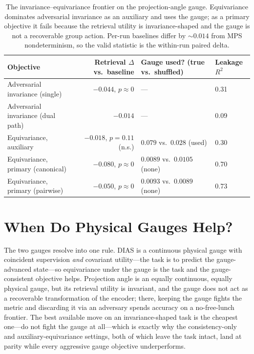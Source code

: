 \documentclass[11pt]{article}
\begin{document}
\begin{table}[h]
\centering
\caption{The invariance--equivariance frontier on the projection-angle gauge. Equivariance dominates
adversarial invariance as an auxiliary and uses the gauge; as a primary objective it fails because
the retrieval utility is invariance-shaped and the gauge is not a recoverable group action.
Per-run baselines differ by $\sim\!0.014$ from MPS nondeterminism, so the valid statistic is the
within-run paired delta.}
\label{tab:frontier}
\small
\begin{tabular}{lrll}
\toprule
Objective & Retrieval $\Delta$ vs.\ baseline & Gauge used? (true vs.\ shuffled) & Leakage $R^2$ \\
\midrule
Adversarial invariance (single) & $-0.044$, $p\approx0$ & --- & 0.31 \\
Adversarial invariance (dual path) & $-0.014$ & --- & 0.09 \\
Equivariance, auxiliary & $-0.018$, $p=0.11$ (n.s.) & $0.079$ vs.\ $0.028$ (used) & 0.30 \\
Equivariance, primary (canonical) & $-0.080$, $p\approx0$ & $0.0089$ vs.\ $0.0105$ (none) & 0.70 \\
Equivariance, primary (pairwise) & $-0.050$, $p\approx0$ & $0.0093$ vs.\ $0.0089$ (none) & 0.73 \\
\bottomrule
\end{tabular}
\end{table}

\section{When Do Physical Gauges Help?}\label{sec:when}

The two gauges resolve into one rule. DIAS is a continuous physical gauge with coincident supervision
\emph{and} covariant utility---the task is to predict the gauge-advanced state---so equivariance
under the gauge is the task and the gauge-consistent objective helps. Projection angle is an equally
continuous, equally physical gauge, but its retrieval utility is invariant, and the gauge does not act
as a recoverable transformation of the encoder; there, keeping the gauge fights the metric and
discarding it via an adversary spends accuracy on a no-free-lunch frontier. The best available move
on an invariance-shaped task is the cheapest one---do not fight the gauge at all---which is exactly
why the consistency-only and auxiliary-equivariance settings, both of which leave the task intact,
land at parity while every aggressive gauge objective underperforms.
\end{document}
